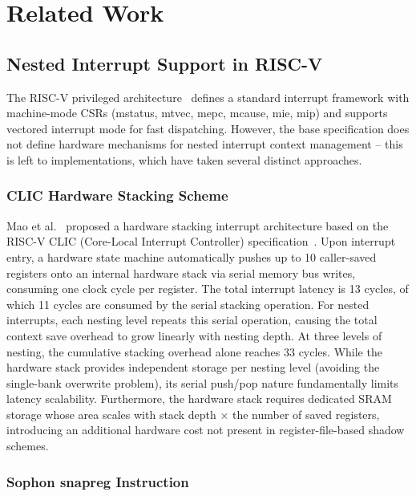 \documentclass[letterpaper,journal]{IEEEtran}
\begin{document}
\section{Related Work}

\subsection{Nested Interrupt Support in RISC-V}

The RISC-V privileged architecture~\cite{ref4} defines a standard interrupt framework with machine-mode CSRs (mstatus, mtvec, mepc, mcause, mie, mip) and supports vectored interrupt mode for fast dispatching.
However, the base specification does not define hardware mechanisms for nested interrupt context management -- this is left to implementations, which have taken several distinct approaches.

\subsubsection{CLIC Hardware Stacking Scheme}

Mao et al.~\cite{ref5} proposed a hardware stacking interrupt architecture based on the RISC-V CLIC (Core-Local Interrupt Controller) specification~\cite{ref6}.
Upon interrupt entry, a hardware state machine automatically pushes up to 10 caller-saved registers onto an internal hardware stack via serial memory bus writes, consuming one clock cycle per register.
The total interrupt latency is 13 cycles, of which 11 cycles are consumed by the serial stacking operation.
For nested interrupts, each nesting level repeats this serial operation, causing the total context save overhead to grow linearly with nesting depth.
At three levels of nesting, the cumulative stacking overhead alone reaches 33 cycles.
While the hardware stack provides independent storage per nesting level (avoiding the single-bank overwrite problem), its serial push/pop nature fundamentally limits latency scalability.
Furthermore, the hardware stack requires dedicated SRAM storage whose area scales with stack depth $\times$ the number of saved registers, introducing an additional hardware cost not present in register-file-based shadow schemes.

\subsubsection{Sophon snapreg Instruction}
\end{document}
